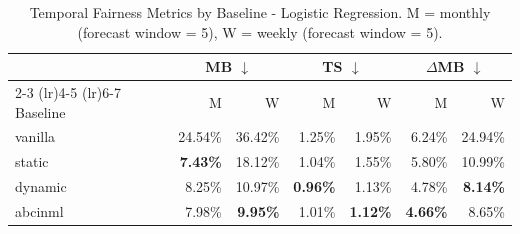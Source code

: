 \begin{table}
  \small
  \caption{Temporal Fairness Metrics by Baseline - Logistic Regression. M = monthly (forecast window = 5), W = weekly (forecast window = 5).}
  \label{tab:temporal-lr-combined}
  \begin{tabular}{lrrrrrr}
    \toprule
     & \multicolumn{2}{c}{MB $\downarrow$} & \multicolumn{2}{c}{TS $\downarrow$} & \multicolumn{2}{c}{$\Delta$MB $\downarrow$} \\
    \cmidrule(lr){2-3} \cmidrule(lr){4-5} \cmidrule(lr){6-7}
    Baseline & M & W & M & W & M & W \\
    \midrule
    vanilla & 24.54\% & 36.42\% & 1.25\% & 1.95\% & 6.24\% & 24.94\% \\
    static & \textbf{7.43\%} & 18.12\% & 1.04\% & 1.55\% & 5.80\% & 10.99\% \\
    dynamic & 8.25\% & 10.97\% & \textbf{0.96\%} & 1.13\% & 4.78\% & \textbf{8.14\%} \\
    abcinml & 7.98\% & \textbf{9.95\%} & 1.01\% & \textbf{1.12\%} & \textbf{4.66\%} & 8.65\% \\
    \bottomrule
  \end{tabular}
\end{table}
